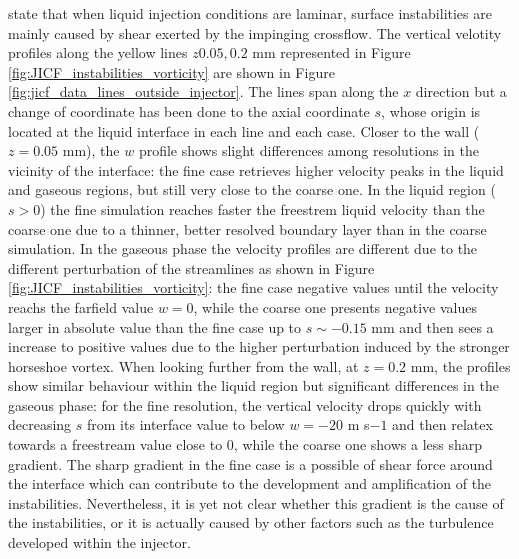  state that when liquid injection conditions are laminar, surface instabilities are mainly caused by shear exerted by the impinging crossflow. The vertical velotity profiles along the yellow lines $z 0.05, 0.2$ mm represented in Figure \ref{fig:JICF_instabilities_vorticity} are shown in Figure \ref{fig:jicf_data_lines_outside_injector}. The lines span along the $x$ direction but a change of coordinate has been done to the axial coordinate $s$, whose origin is located at the liquid interface in each line and each case. Closer to the wall ($z = 0.05$ mm), the $w$ profile shows slight differences among resolutions in the vicinity of the interface: the fine case retrieves higher velocity peaks in the liquid and gaseous regions, but still very close to the coarse one. In the liquid region ($s > 0$) the fine simulation reaches faster the freestrem liquid velocity than the coarse one due to a thinner, better resolved boundary layer than in the coarse simulation. In the gaseous phase the velocity profiles are different due to the different perturbation of the streamlines as shown in Figure \ref{fig:JICF_instabilities_vorticity}: the fine case negative values until the velocity reachs the farfield value $w = 0$, while the coarse one presents negative values larger in absolute value than the fine case up to $s \sim -0.15$ mm and then sees a increase to positive values due to the higher perturbation induced by the stronger horseshoe vortex. When looking further from the wall, at $z = 0.2$ mm, the profiles show similar behaviour within the liquid region but significant differences in the gaseous phase: for the fine resolution, the vertical velocity drops quickly with decreasing $s$ from its interface value to below $w = - 20$ m s${-1}$ and then relatex towards a freestream value close to 0, while the coarse one shows a less sharp gradient. The sharp gradient in the fine case is a possible of shear force around the interface which can contribute to the development and amplification of the instabilities. Nevertheless, it is yet not clear whether this gradient is the cause of the instabilities, or it is actually caused by other factors such as the turbulence developed within the injector.


